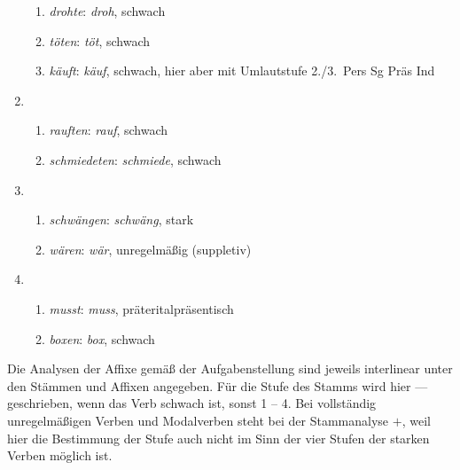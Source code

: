 \begin{enumerate}
\begin{enumerate}
      \item \textit{drohte}: \textit{droh}, schwach
      \item \textit{töten}: \textit{töt}, schwach
      \item \textit{käuft}: \textit{käuf}, schwach, hier aber mit Umlautstufe 2.\slash 3.~Pers Sg Präs Ind
    \end{enumerate}
  \item
    \begin{enumerate}\Lf
      \item \textit{rauften}: \textit{rauf}, schwach
      \item \textit{schmiedeten}: \textit{schmiede}, schwach
    \end{enumerate}
  \item
    \begin{enumerate}\Lf
      \item \textit{schwängen}: \textit{schwäng}, stark
      \item \textit{wären}: \textit{wär}, unregelmäßig (suppletiv)
    \end{enumerate}
  \item
    \begin{enumerate}\Lf
      \item \textit{musst}: \textit{muss}, präteritalpräsentisch
      \item \textit{boxen}: \textit{box}, schwach
    \end{enumerate}
\end{enumerate}


Die Analysen der Affixe gemäß der Aufgabenstellung sind jeweils interlinear unter den Stämmen und Affixen angegeben.
Für die Stufe des Stamms wird hier --- geschrieben, wenn das Verb schwach ist, sonst 1 -- 4.
Bei vollständig unregelmäßigen Verben und Modalverben steht bei der Stammanalyse $+$, weil hier die Bestimmung der Stufe auch nicht im Sinn der vier Stufen der starken Verben möglich ist.

\setcounter{equation}{0}

